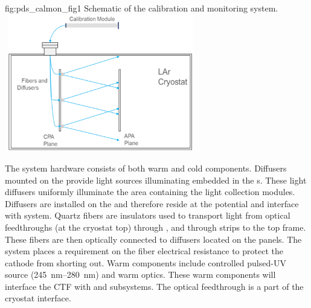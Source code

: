 
\begin{dunefigure}
 {fig:pds_calmon_fig1}
 {Schematic of the   calibration and monitoring system.}
\includegraphics[angle=0,width=8.4cm,height=6cm]{graphics/pds-calmon-fig1-old.png}
\end{dunefigure}

The system hardware consists of both warm and cold components. Diffusers mounted on the  provide light sources illuminating  embedded in the s. These light diffusers uniformly illuminate the  area containing the  light collection modules. %
 Diffusers are installed on the  and therefore reside at the %
  potential and interface with  system. 
Quartz fibers are insulators used to transport light from optical feedthroughs (at the cryostat top) through  , and through  strips to the  top frame. These fibers are then optically connected to diffusers located on the  panels. 
The \hv system %
places a requirement on the fiber electrical resistance to %
protect the cathode %
from shorting out. %
Warm components include controlled pulsed-UV source (\SIrange{245}{280}{nm}) and warm optics. These warm components will interface the CTF with %
 and  subsystems. The optical feedthrough is a part of the cryostat interface.

